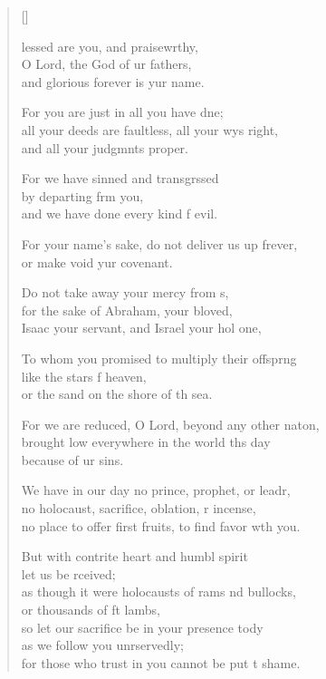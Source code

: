 \settowidth{\versewidth}{no place to offer first fruits, to find favor with you.}
\begin{verse}[\versewidth]
  \begin{patverse}
lessed are you, and praisewrthy,\Flex\\
O Lord, the God of ur fathers,\Med\\
and glorious forever is yur name.

For you are just in all you have dne;\Flex\\
all your deeds are faultless, all your wys right,\Med\\
and all your judgmnts proper.

For we have sinned and transgrssed\Flex\\
by departing frm you,\Med\\
and we have done every kind f evil.

For your name’s sake, do not deliver us up frever,\Med\\
or make void yur covenant.

Do not take away your mercy from s,\Flex\\
for the sake of Abraham, your bloved,\Med\\
Isaac your servant, and Israel your hol one,

To whom you promised to multiply their offspr\pointup{\i}ng\Flex\\
like the stars f heaven,\Med\\
or the sand on the shore of th sea.

For we are reduced, O Lord, beyond any other nat\pointup{\i}on,\Flex\\
brought low everywhere in the world th\pointup{\i}s day\Med\\
because of ur sins.

We have in our day no prince, prophet, or leadr,\Flex\\
no holocaust, sacrifice, oblation, r incense,\Med\\
no place to offer first fruits, to find favor w\pointup{\i}th you.

But with contrite heart and humbl spirit\Med\\
let us be rceived;\\
as though it were holocausts of rams nd bullocks,\Med\\
or thousands of ft lambs,\\
so let our sacrifice be in your presence tody\Flex\\
as we follow you unrservedly;\Med\\
for those who trust in you cannot be put t shame.


\end{patverse}
\end{verse}
